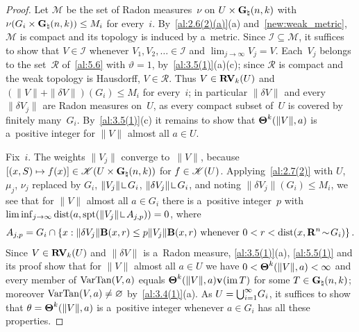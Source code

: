 \begin{proof}
    Let $\mathcal{M}$ be the set of Radon measures~$\nu$ on $U \times \mathbf{G}_{\natural}(n,k)$ with
    $\nu(G_i \times \mathbf{G}_{\natural}(n,k)) \le M_i$ for every~$i$. By~\ref{al:2.6(2)(a)}(a)
    and~\ref{new:weak_metric}, $\mathcal{M}$ is compact and its topology is induced by a~metric.
    Since $\mathcal{I} \subseteq \mathcal{M}$, it suffices to show that $V \in \mathcal{I}$
    whenever $V_1, V_2, \ldots \in \mathcal{I}$ and $\lim_{j \to \infty} V_j = V$. Each~$V_j$
    belongs to the set~$\mathcal{R}$ of~\ref{al:5.6} with $\vartheta = 1$,
    by~\ref{al:3.5(1)}(a)(c); since $\mathcal{R}$ is compact and the weak topology is Hausdorff,
    $V \in \mathcal{R}$. Thus $V \in \mathbf{RV}_{k}(U)$ and $(\|V\| + \|\delta V\|)(G_i) \le M_i$
    for every~$i$; in particular $\|\delta V\|$ and every $\|\delta V_j\|$ are Radon measures
    on~$U$, as every compact subset of~$U$ is covered by finitely many~$G_i$. By~\ref{al:3.5(1)}(c)
    it remains to show that $\boldsymbol{\Theta}^{k}(\|V\|,a)$ is a~positive integer for $\|V\|$ almost
    all $a \in U$.

    Fix~$i$. The weights $\|V_j\|$ converge to~$\|V\|$, because $[(x,S) \mapsto f(x)] \in
    \mathscr{K}(U \times \mathbf{G}_{\natural}(n,k))$ for $f \in \mathscr{K}(U)$. Applying~\ref{al:2.7(2)}
    with $U$, $\mu_j$, $\nu_j$ replaced by $G_i$, $\|V_j\| \restrict G_i$, $\|\delta V_j\|
    \restrict G_i$, and noting $\|\delta V_j\|(G_i) \le M_i$, we see that for $\|V\|$ almost all
    $a \in G_i$ there is a~positive integer~$p$ with $\liminf_{j \to \infty} \dist(a, \spt(\|V_j\|
    \restrict A_{j,p})) = 0$, where
    \begin{displaymath}
        A_{j,p} = G_i \cap \{ x : \|\delta V_j\| \mathbf{B}(x,r) \le p \|V_j\| \mathbf{B}(x,r) \text{
        whenever } 0 < r < \operatorname{dist}(x, \mathbf{R}^{n} \!\sim\! G_i) \} \,.
    \end{displaymath}
    Since $V \in \mathbf{RV}_{k}(U)$ and $\|\delta V\|$ is a~Radon measure, \ref{al:3.5(1)}(a),
    \ref{al:5.5(1)} and its proof show that for $\|V\|$ almost all $a \in U$ we have $0 <
    \boldsymbol{\Theta}^{k}(\|V\|,a) < \infty$ and every member of $\operatorname{VarTan}(V,a)$ equals
    $\boldsymbol{\Theta}^{k}(\|V\|,a) \mathbf{v}_{}(\operatorname{im} T)$ for some $T \in \mathbf{G}_{\natural}(n,k)$; moreover
    $\operatorname{VarTan}(V,a) \ne \varnothing$ by~\ref{al:3.4(1)}(a). As $U = {{\textstyle \bigcup}}_{i=1}^\infty G_i$, it
    suffices to show that $\theta = \boldsymbol{\Theta}^{k}(\|V\|,a)$ is a~positive integer whenever $a
    \in G_i$ has all these properties.


\end{proof}
